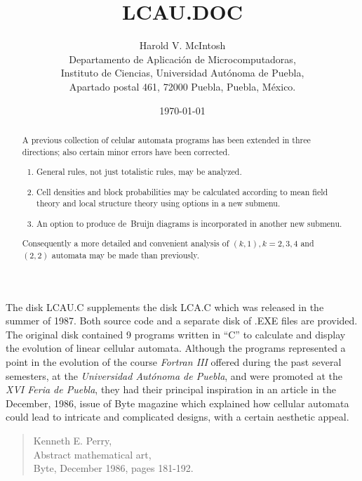 
\topmargin 0in \textheight 434pt
\evensidemargin 0.5in \oddsidemargin 0.5in
\textwidth 360pt \marginparwidth 0in \marginparsep 0pt


\title{LCAU.DOC}

\author{
Harold V. McIntosh \\
Departamento de Aplicaci\'on de Microcomputadoras,\\
Instituto de Ciencias, Universidad Aut\'onoma de Puebla,\\
Apartado postal 461, 72000 Puebla, Puebla, M\'exico.}

\date{\today}
\maketitle 

\begin{abstract} 
A previous collection of celular automata programs has been extended in 
three directions; also certain minor errors have been corrected. 
\begin{enumerate} 
\item General rules, not just totalistic rules, may be analyzed.
\item Cell densities and block probabilities may be calculated 
according to mean field theory and local structure theory using options 
in a new submenu.
\item An option to produce de~Bruijn diagrams is incorporated in another 
new submenu. 
\end{enumerate} 
Consequently a more detailed and convenient analysis of $(k,1), k=2,3,4$ 
and $(2,2)$ automata may be made than previously.  
\end{abstract}

The disk LCAU.C supplements the disk LCA.C which was released in the 
summer of 1987. Both source code and a separate disk of .EXE files are 
provided. The original disk contained 9 programs written in ``C'' to 
calculate and display the evolution of linear cellular automata. 
Although the programs represented a point in the evolution of the 
course {\em Fortran III} offered during the past several semesters, at 
the {\em Universidad Aut\'onoma de Puebla}, and were promoted at the 
{\em XVI Feria de Puebla}, they had their principal inspiration in an 
article in the December, 1986, issue of Byte magazine which explained 
how cellular automata could lead to intricate and complicated designs, 
with a certain aesthetic appeal. 

\begin{quotation} 
\noindent
	Kenneth E. Perry, \\
	Abstract mathematical art, \\
	Byte, December 1986, pages 181-192. 
\end{quotation} 


